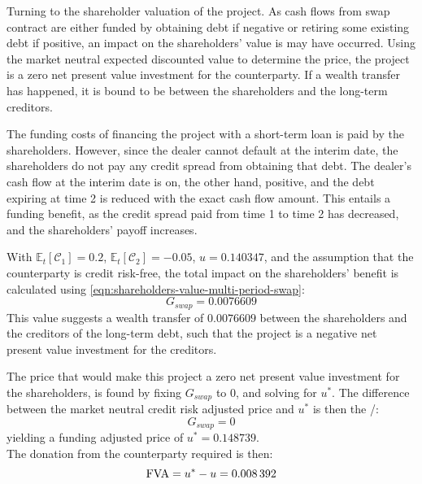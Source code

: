 \documentclass[main.tex]{subfiles}
\begin{document}
            Turning to the shareholder valuation of the project.
            As cash flows from swap contract are either funded by obtaining debt if negative or retiring some existing debt if positive,
            an impact on the shareholders' value is may have occurred.
            Using the market neutral expected discounted value to determine the price, the project is a zero net present value investment for the counterparty.
            If a wealth transfer has happened, it is bound to be between the shareholders and the long-term creditors.

            The funding costs of financing the project with a short-term loan is paid by the shareholders.
            However, since the dealer cannot default at the interim date,
            the shareholders do not pay any credit spread from obtaining that debt.
            The dealer's cash flow at the interim date is on, the other hand, positive,
            and the debt expiring at time 2 is reduced with the exact cash flow amount.
            This entails a funding benefit, as the credit spread paid from time 1 to time 2 has decreased,
            and the shareholders' payoff increases.
            
            With $\mathbb{E}_{t}\left[\mathcal{C}_1\right]=\num{0.2}$,
            $\mathbb{E}_{t}\left[\mathcal{C}_2\right]=\num{-0.05}$,
            $u=\num{0.140347}$,
            and the assumption that the counterparty is credit risk-free,
            the total impact on the shareholders' benefit is calculated using \cref{eqn:shareholders-value-multi-period-swap}:
            \begin{equation}
                G_{swap} = \num{0.0076609}
            \end{equation}
            This value suggests a wealth transfer of $\num{0.0076609}$
            between the shareholders and the creditors of the long-term debt,
            such that the project is a negative net present value investment for the creditors.

            The price that would make this project a zero net present value investment for the shareholders,
            is found by fixing $G_{swap}$ to 0,
            and solving for $u^{\ast}$.
            The difference between the market neutral credit risk adjusted price and $u^{\ast}$ is then the \FVA/:
            \begin{equation}
                G_{swap} = 0
            \end{equation}
            yielding a funding adjusted price of $u^{\ast} = \num{0.148739}$.
            \\
            The donation from the counterparty required is then:
            \begin{equation}
                \FVA/ = u^{\ast} - u = \num{0.008392}
            \end{equation}
\end{document}
